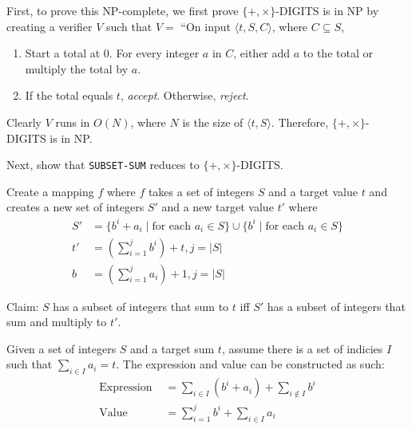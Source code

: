 \documentclass{article}
\begin{document}
        First, to prove this NP-complete, we first prove $\{+, \times\}$-DIGITS is in NP by creating a verifier $V$ such that $V = $ ``On input $\langle t, S, C\rangle$, where $C \subseteq S$,
        \begin{enumerate}[1.]
            \item Start a total at 0. For every integer $a$ in $C$, either add $a$ to the total or multiply the total by $a$. 

            \item If the total equals $t$, \textit{accept}. Otherwise, \textit{reject}.
        \end{enumerate}

        Clearly $V$ runs in $O(N)$, where $N$ is the size of $\langle t, S \rangle$. Therefore, $\{+, \times\}$-DIGITS is in NP.

        Next, show that \texttt{SUBSET-SUM} reduces to $\{+, \times\}$-DIGITS.

        Create a mapping $f$ where $f$ takes a set of integers $S$ and a target value $t$ and creates a new set of integers $S'$ and a new target value $t'$ where
        \begin{equation*}
        \begin{aligned}
            S' &= \{b^i + a_i \mid \text{for each } a_i \in S\} \cup \{b^i \mid \text{for each } a_i \in S\} \\
            t' &= \left( \sum_{i=1}^j b^i \right) + t, j = |S| \\
            b  &= \left(\sum_{i=1}^j a_i \right) + 1, j = |S|
        \end{aligned}
        \end{equation*}

        Claim: $S$ has a subset of integers that sum to $t$ iff $S'$ has a subset of integers that sum and multiply to $t'$. 

        Given a set of integers $S$ and a target sum $t$, assume there is a set of indicies $I$ such that $\sum_{i \in I} a_i = t$. The expression and value can be constructed as such:
        \begin{equation*}
        \begin{aligned}
            \text{Expression } &= \sum_{i \in I} (b^i + a_i) + \sum_{i \notin I} b^i \\
            \text{Value } &= \sum_{i=1}^j b^i + \sum_{i \in I} a_i
        \end{aligned}
        \end{equation*}
\end{document}
